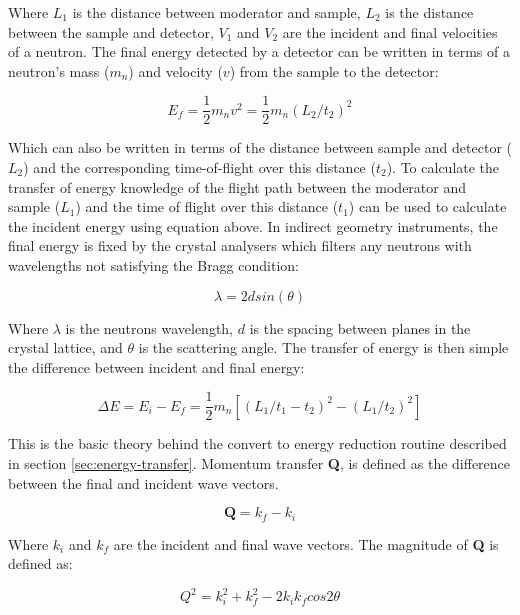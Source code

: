 \documentclass[paper=a4, fontsize=11pt]{scrartcl}	%
\numberwithin{equation}{section}															%
\numberwithin{figure}{section}																%
\numberwithin{table}{section}																%
\begin{document}
Where $L_1$ is the distance between moderator and sample, $L_2$ is the distance between the sample and detector, $V_1$ and $V_2$ are the incident and final velocities of a neutron. The final energy detected by a detector can be written in terms of a neutron's mass ($m_{n}$) and velocity ($v$) from the sample to the detector:

\begin{equation}
E_f = \frac{1}{2}m_{n}v^2 = \frac{1}{2}m_{n} ( L_2 / t_2 ) ^2
\end{equation}

Which can also be written in terms of the distance between sample and detector ($L_2$) and the corresponding time-of-flight over this distance ($t_2$). To calculate the transfer of energy knowledge of the flight path between the moderator and sample ($L_1$) and the time of flight over this distance ($t_1$) can be used to calculate the incident energy using equation above. In indirect geometry instruments, the final energy is fixed by the crystal analysers which filters any neutrons with wavelengths not satisfying the Bragg condition:

\begin{equation}
\label{eq:braggs-law}
\lambda = 2dsin(\theta)
\end{equation}

Where $\lambda$ is the neutrons wavelength, $d$ is the spacing between planes in the crystal lattice, and $\theta$ is the scattering angle. The transfer of energy is then simple the difference between incident and final energy:

\begin{equation}
\Delta E = E_i - E_f = \frac{1}{2}m_n[(L_1 / t_1-t_2)^2 - (L_1/t_2)^2]
\end{equation}

This is the basic theory behind the convert to energy reduction routine described in section \ref{sec:energy-transfer}. Momentum transfer \textbf{Q}, is defined as the difference between the final and incident wave vectors.

\begin{equation}
\mathbf{Q} = k_f - k_i
\end{equation}

Where $k_i$ and $k_f$ are the incident and final wave vectors. The magnitude of \textbf{Q} is defined as:

\begin{equation}
Q^2 = k_i^2 + k_f^2 - 2k_ik_fcos 2\theta
\end{equation}
\end{document}

